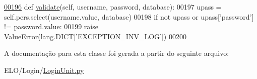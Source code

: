 \begin{DoxyCode}
\hypertarget{classLogin_1_1LoginUnit_1_1BusLogin_l00196}{}\hyperlink{classLogin_1_1LoginUnit_1_1BusLogin_a88b18ffaeaa3a53934aa38338de3b1c0}{00196}     \textcolor{keyword}{def }\hyperlink{classLogin_1_1LoginUnit_1_1BusLogin_a88b18ffaeaa3a53934aa38338de3b1c0}{validate}(self, username, password, database):
00197         upass = self.pers.select(username.value, database)
00198         \textcolor{keywordflow}{if} \textcolor{keywordflow}{not} upass \textcolor{keywordflow}{or} upass[\textcolor{stringliteral}{'password'}] != password.value:
00199             \textcolor{keywordflow}{raise} ValueError(lang.DICT[\textcolor{stringliteral}{'EXCEPTION\_INV\_LOG'}])
00200 
\end{DoxyCode}


A documentação para esta classe foi gerada a partir do seguinte arquivo\+:\begin{DoxyCompactItemize}
\item 
E\+L\+O/\+Login/\hyperlink{LoginUnit_8py}{Login\+Unit.\+py}\end{DoxyCompactItemize}
